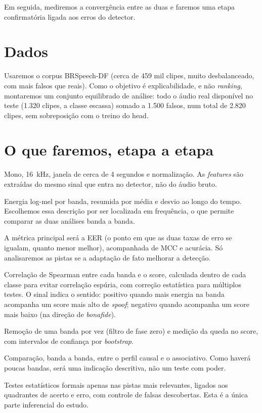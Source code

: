 \documentclass[11pt,a4paper]{article}
\begin{document}
Em seguida, mediremos a convergência entre as duas e faremos uma etapa
confirmatória ligada aos erros do detector.

\section{Dados}

Usaremos o corpus BRSpeech-DF (cerca de 459 mil clipes, muito desbalanceado, com
mais falsos que reais). Como o objetivo é explicabilidade, e não \emph{ranking},
montaremos um conjunto equilibrado de análise: todo o áudio real disponível no
teste (1.320 clipes, a classe escassa) somado a 1.500 falsos, num total de 2.820
clipes, sem sobreposição com o treino do head.

\section{O que faremos, etapa a etapa}

\begin{description}[leftmargin=1.4em]
  \item[Pré-processamento.] Mono, 16~kHz, janela de cerca de 4 segundos e
        normalização. As \emph{features} são extraídas do mesmo sinal que entra no
        detector, não do áudio bruto.
  \item[Descrição acústica.] Energia log-mel por banda, resumida por média e
        desvio ao longo do tempo. Escolhemos essa descrição por ser localizada em
        frequência, o que permite comparar as duas análises banda a banda.
  \item[Desempenho.] A métrica principal será a EER (o ponto em que as duas taxas
        de erro se igualam, quanto menor melhor), acompanhada de MCC e acurácia.
        Só analisaremos as pistas se a adaptação de fato melhorar a detecção.
  \item[Análise associativa.] Correlação de Spearman entre cada banda e o score,
        calculada dentro de cada classe para evitar correlação espúria, com
        correção estatística para múltiplos testes. O sinal indica o sentido:
        positivo quando mais energia na banda acompanha um score mais alto de
        \emph{spoof}; negativo quando acompanha um score mais baixo (na direção de
        \emph{bonafide}).
  \item[Análise causal.] Remoção de uma banda por vez (filtro de fase zero) e
        medição da queda no score, com intervalos de confiança por \emph{bootstrap}.
  \item[Convergência.] Comparação, banda a banda, entre o perfil causal e o
        associativo. Como haverá poucas bandas, será uma indicação descritiva, não
        um teste com poder.
  \item[Confirmatória.] Testes estatísticos formais apenas nas pistas mais
        relevantes, ligados aos quadrantes de acerto e erro, com controle de
        falsas descobertas. Esta é a única parte inferencial do estudo.
\end{description}
\end{document}
